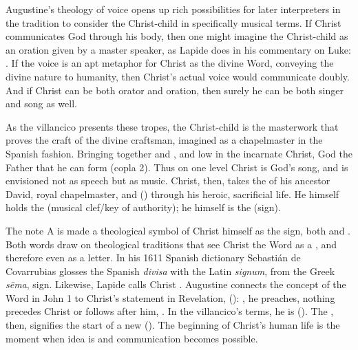 Augustine's theology of voice opens up rich possibilities for later interpreters
in the tradition to consider the Christ-child in specifically musical terms.
If Christ communicates God through his body, then one might imagine the
Christ-child as an oration given by a master speaker, as Lapide does in his
commentary on Luke:
.%
    \Autocite[673, on ]{Lapide:Gospels19C} 
If the voice is an apt metaphor for Christ as the divine Word, conveying the
divine nature to humanity, then Christ's actual voice would communicate doubly.
And if Christ can be both orator and oration, then surely he can be both singer
and song as well.

As the villancico  presents these tropes, the
Christ-child is the masterwork that proves the craft of the divine craftsman,
imagined as a chapelmaster in the Spanish fashion.
Bringing together  and ,  and low
in the incarnate Christ, God the Father  that he can form
 (copla 2).
Thus on one level Christ is God's song, and  is envisioned not
as speech but as music.
Christ, then, takes the  of his ancestor David, royal
chapelmaster, and  () through his
heroic, sacrificial life.
He himself holds the  (musical clef/key of authority); he
himself is the  (sign).

The note A is made a theological symbol of Christ himself as the sign, both
 and .
Both words draw on theological traditions that see Christ the Word as a
, and therefore even as a letter.
In his 1611 Spanish dictionary Sebastián de Covarrubias glosses the Spanish
\emph{divisa} with the Latin \emph{signum}, from the Greek \emph{sēma}, sign. 
Likewise, Lapide calls Christ .%
    \Autocites
    []{Covarrubias:Tesoro}
    [685--686, on Lk 2]{Lapide:Gospels19C}
Augustine connects the concept of the Word in John 1 to Christ's statement in
Revelation,  (): , he preaches, nothing precedes Christ or follows after
him, .%
    \Autocites
    [, 118r, In Natali Domini 2]
    {Augustine:Opera1555} 
    [on Rv 1]{Lapide:Apocalypse1627}
In the villancico's terms, he is 
().
The , then, signifies the start of a new 
().
The beginning of Christ's human life is the moment when idea is  and communication becomes possible.

